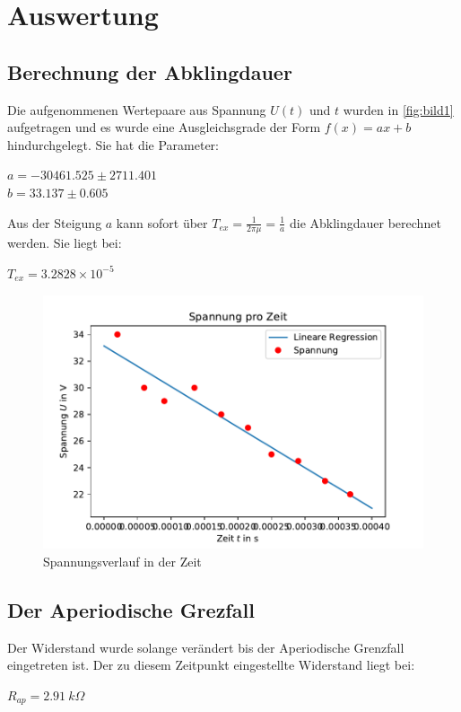\section{Auswertung}
\subsection{Berechnung der Abklingdauer}
\label{sec:abklingdauer}
Die aufgenommenen Wertepaare aus Spannung $U(t)$ und $t$ wurden in \autoref{fig:bild1}
aufgetragen und es wurde eine Ausgleichsgrade der Form $f(x)=ax+b$ hindurchgelegt. Sie hat die Parameter:
\begin{center}
    $a=-30461.525 \pm 2711.401$\\
    $b=33.137 \pm 0.605$\\
\end{center}  
Aus der Steigung $a$ kann sofort über $T_{ex}=\frac{1}{2\pi \mu}=\frac{1}{a}$ die Abklingdauer berechnet werden. Sie liegt bei:
\begin{center}
    $T_{ex}=3.2828\times 10^{-5}$\\
\end{center}
\begin{figure}
    \centering
    \includegraphics{spannungsverlauf.pdf}
    \caption{Spannungsverlauf in der Zeit}
    \label{fig:bild1}
  \end{figure}

  \subsection{Der Aperiodische Grezfall}
  Der Widerstand wurde solange verändert bis der Aperiodische Grenzfall eingetreten ist. Der zu diesem Zeitpunkt eingestellte Widerstand liegt bei:
  \begin{center}
      $R_{ap}=\SI[]{2.91}[]{k\Omega}$
  \end{center}
